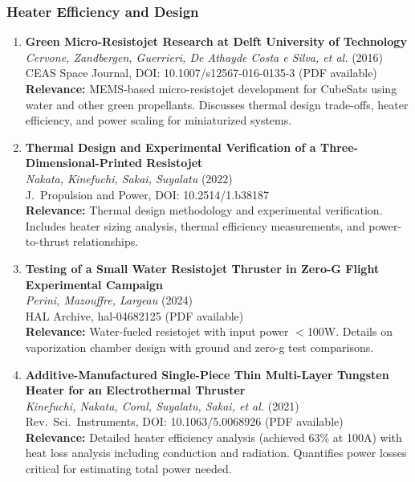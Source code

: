 \documentclass[11pt]{article}
\begin{document}
\subsubsection{Heater Efficiency and Design}

\begin{enumerate}[label=\textbf{\arabic*.},resume]
    \item \textbf{Green Micro-Resistojet Research at Delft University of Technology}\\
    \textit{Cervone, Zandbergen, Guerrieri, De Athayde Costa e Silva, et al.} (2016)\\
    CEAS Space Journal, DOI: 10.1007/s12567-016-0135-3 (PDF available)\\
    \textbf{Relevance:} MEMS-based micro-resistojet development for CubeSats using water and other green propellants. Discusses thermal design trade-offs, heater efficiency, and power scaling for miniaturized systems.

    \item \textbf{Thermal Design and Experimental Verification of a Three-Dimensional-Printed Resistojet}\\
    \textit{Nakata, Kinefuchi, Sakai, Suyalatu} (2022)\\
    J.\ Propulsion and Power, DOI: 10.2514/1.b38187\\
    \textbf{Relevance:} Thermal design methodology and experimental verification. Includes heater sizing analysis, thermal efficiency measurements, and power-to-thrust relationships.

    \item \textbf{Testing of a Small Water Resistojet Thruster in Zero-G Flight Experimental Campaign}\\
    \textit{Perini, Mazouffre, Largeau} (2024)\\
    HAL Archive, hal-04682125 (PDF available)\\
    \textbf{Relevance:} Water-fueled resistojet with input power $<$100W. Details on vaporization chamber design with ground and zero-g test comparisons.

    \item \textbf{Additive-Manufactured Single-Piece Thin Multi-Layer Tungsten Heater for an Electrothermal Thruster}\\
    \textit{Kinefuchi, Nakata, Coral, Suyalatu, Sakai, et al.} (2021)\\
    Rev.\ Sci.\ Instruments, DOI: 10.1063/5.0068926 (PDF available)\\
    \textbf{Relevance:} Detailed heater efficiency analysis (achieved 63\% at 100A) with heat loss analysis including conduction and radiation. Quantifies power losses critical for estimating total power needed.
\end{enumerate}
\end{document}
